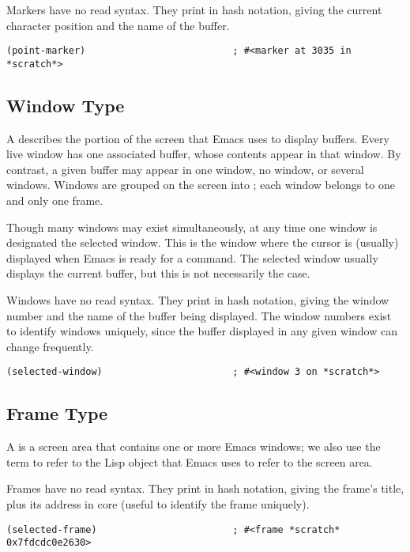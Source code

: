 Markers have no read syntax.
They print in hash notation, giving the current character position and the name of the buffer.
\begin{lstlisting}
(point-marker)                          ; #<marker at 3035 in *scratch*>
\end{lstlisting}

\subsection{Window Type}
\label{sec:window-type}

A  describes the portion of the screen that Emacs uses to display buffers.
Every live window has one associated buffer, whose contents appear in that window.
By contrast, a given buffer may appear in one window, no window, or several windows.
Windows are grouped on the screen into ; each window belongs to one and only one frame.


Though many windows may exist simultaneously, at any time one window is designated the selected window.
This is the window where the cursor is (usually) displayed when Emacs is ready for a command.
The selected window usually displays the current buffer, but this is not necessarily the case.


Windows have no read syntax.
They print in hash notation, giving the window number and the name of the buffer being displayed.
The window numbers exist to identify windows uniquely, since the buffer displayed in any given window can change frequently.
\begin{lstlisting}
(selected-window)                       ; #<window 3 on *scratch*>
\end{lstlisting}


\subsection{Frame Type}
\label{sec:frame-type}

A  is a screen area that contains one or more Emacs windows; we also use the term  to refer to the Lisp object that Emacs uses to refer to the screen area.


Frames have no read syntax.
They print in hash notation, giving the frame’s title, plus its address in core (useful to identify the frame uniquely).
\begin{lstlisting}
(selected-frame)                        ; #<frame *scratch* 0x7fdcdc0e2630>
\end{lstlisting}

